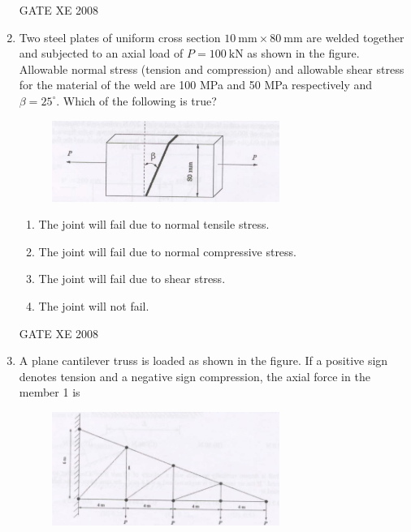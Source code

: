 \documentclass[12pt]{article}
\begin{document}
\begin{enumerate}
\begin{enumerate}
\end{enumerate}
    
    GATE XE 2008
    
    \item Two steel plates of uniform cross section $10 \ \mathrm{mm} \times 80 \ \mathrm{mm}$ are welded together and subjected to an axial load of $P=100 \ \mathrm{kN}$ as shown in the figure. Allowable normal stress (tension and compression) and allowable shear stress for the material of the weld are 100 MPa and 50 MPa respectively and $\beta = 25^\circ$. Which of the following is true?

    \begin{figure}[H]
\centering
  \includegraphics[width=0.7\textwidth]{figs/ass1_f_q15.png}
  \caption{}
\end{figure}

\begin{enumerate}
\item  The joint will fail due to normal tensile stress.
\item  The joint will fail due to normal compressive stress.
\item  The joint will fail due to shear stress.
\item  The joint will not fail.
\end{enumerate}
    
    GATE XE 2008
    
    \item A plane cantilever truss is loaded as shown in the figure. If a positive sign denotes tension and a negative sign compression, the axial force in the member 1 is

     \begin{figure}[H]
    \centering
    \includegraphics[width=0.7\textwidth]{figs/ass1_f_q16.png}
    \caption{}
\end{figure}


\end{enumerate}
\end{document}
